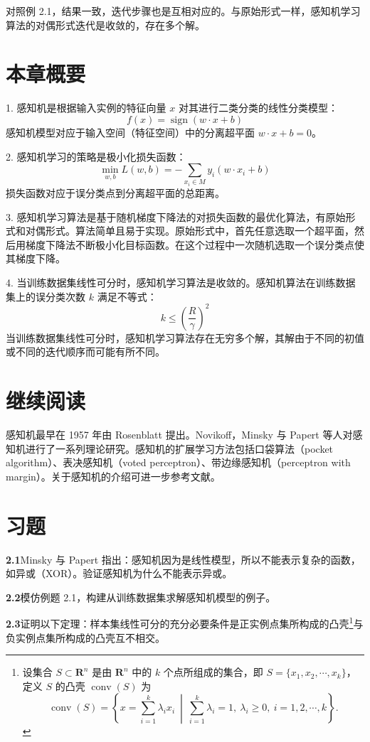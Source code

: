 \documentclass[UTF8,12pt,a4paper,fontset=fandol]{ctexart}
\begin{document}
对照例 2.1，结果一致，迭代步骤也是互相对应的。与原始形式一样，感知机学习算法的对偶形式迭代是收敛的，存在多个解。

\section*{本章概要}

1. 感知机是根据输入实例的特征向量 $x$ 对其进行二类分类的线性分类模型：
\[
  f(x)=\operatorname{sign}(w\cdot x+b)
\]
感知机模型对应于输入空间（特征空间）中的分离超平面 $w\cdot x+b=0$。

2. 感知机学习的策略是极小化损失函数：
\[
  \min_{w,b}L(w,b)=-\sum_{x_i\in M}y_i(w\cdot x_i+b)
\]
损失函数对应于误分类点到分离超平面的总距离。

3. 感知机学习算法是基于随机梯度下降法的对损失函数的最优化算法，有原始形式和对偶形式。算法简单且易于实现。原始形式中，首先任意选取一个超平面，然后用梯度下降法不断极小化目标函数。在这个过程中一次随机选取一个误分类点使其梯度下降。

4. 当训练数据集线性可分时，感知机学习算法是收敛的。感知机算法在训练数据集上的误分类次数 $k$ 满足不等式：
\[
  k\le\left(\frac{R}{\gamma}\right)^2
\]
当训练数据集线性可分时，感知机学习算法存在无穷多个解，其解由于不同的初值或不同的迭代顺序而可能有所不同。

\section*{继续阅读}

感知机最早在 1957 年由 Rosenblatt 提出。Novikoff，Minsky 与 Papert 等人对感知机进行了一系列理论研究。感知机的扩展学习方法包括口袋算法（pocket algorithm）、表决感知机（voted perceptron）、带边缘感知机（perceptron with margin）。关于感知机的介绍可进一步参考文献。

\section*{习题}

\noindent\textbf{2.1}\quad Minsky 与 Papert 指出：感知机因为是线性模型，所以不能表示复杂的函数，如异或（XOR）。验证感知机为什么不能表示异或。

\noindent\textbf{2.2}\quad 模仿例题 2.1，构建从训练数据集求解感知机模型的例子。

\noindent\textbf{2.3}\quad 证明以下定理：样本集线性可分的充分必要条件是正实例点集所构成的凸壳\footnote{设集合 $S\subset\mathbf{R}^n$ 是由 $\mathbf{R}^n$ 中的 $k$ 个点所组成的集合，即 $S=\{x_1,x_2,\cdots,x_k\}$，定义 $S$ 的凸壳 $\operatorname{conv}(S)$ 为
\[
  \operatorname{conv}(S)=\left\{x=\sum_{i=1}^k\lambda_ix_i\ \middle|\ \sum_{i=1}^k\lambda_i=1,\ \lambda_i\ge 0,\ i=1,2,\cdots,k\right\}.
\]}与负实例点集所构成的凸壳互不相交。
\end{document}
